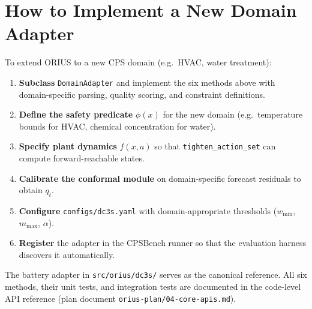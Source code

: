 \begin{center}
\end{center}

\section{How to Implement a New Domain Adapter}

To extend ORIUS to a new CPS domain (e.g.\ HVAC, water treatment):

\begin{enumerate}
  \item \textbf{Subclass} \texttt{DomainAdapter} and implement the six
    methods above with domain-specific parsing, quality scoring, and
    constraint definitions.
  \item \textbf{Define the safety predicate} $\phi(x)$ for the new
    domain (e.g.\ temperature bounds for HVAC, chemical concentration
    for water).
  \item \textbf{Specify plant dynamics} $f(x, a)$ so that
    \texttt{tighten\_action\_set} can compute forward-reachable states.
  \item \textbf{Calibrate the conformal module} on domain-specific
    forecast residuals to obtain $q_t$.
  \item \textbf{Configure} \texttt{configs/dc3s.yaml} with
    domain-appropriate thresholds ($w_{\min}$, $m_{\max}$, $\alpha$).
  \item \textbf{Register} the adapter in the CPSBench runner so that
    the evaluation harness discovers it automatically.
\end{enumerate}

\noindent
The battery adapter in
\texttt{src/orius/dc3s/} serves as the canonical reference.
All six methods, their unit tests, and integration tests are documented
in the code-level API reference
(plan document \texttt{orius-plan/04-core-apis.md}).
